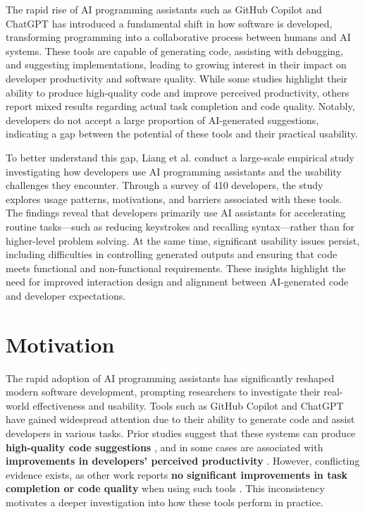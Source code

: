 The rapid rise of AI programming assistants such as GitHub Copilot and ChatGPT has introduced a fundamental shift in how software is developed, transforming programming into a collaborative process between humans and AI systems. These tools are capable of generating code, assisting with debugging, and suggesting implementations, leading to growing interest in their impact on developer productivity and software quality. While some studies highlight their ability to produce high-quality code and improve perceived productivity, others report mixed results regarding actual task completion and code quality. Notably, developers do not accept a large proportion of AI-generated suggestions, indicating a gap between the potential of these tools and their practical usability.

To better understand this gap, Liang et al. conduct a large-scale empirical study investigating how developers use AI programming assistants and the usability challenges they encounter. Through a survey of 410 developers, the study explores usage patterns, motivations, and barriers associated with these tools. The findings reveal that developers primarily use AI assistants for accelerating routine tasks—such as reducing keystrokes and recalling syntax—rather than for higher-level problem solving. At the same time, significant usability issues persist, including difficulties in controlling generated outputs and ensuring that code meets functional and non-functional requirements. These insights highlight the need for improved interaction design and alignment between AI-generated code and developer expectations.

\section{Motivation}
The rapid adoption of AI programming assistants has significantly reshaped modern software development, prompting researchers to investigate their real-world effectiveness and usability. Tools such as GitHub Copilot and ChatGPT have gained widespread attention due to their ability to generate code and assist developers in various tasks. Prior studies suggest that these systems can produce \textbf{high-quality code suggestions} \cite{xu2022systematic,yetistiren2022assessing}, and in some cases are associated with \textbf{improvements in developers’ perceived productivity} \cite{ziegler2022productivity}. However, conflicting evidence exists, as other work reports \textbf{no significant improvements in task completion or code quality} when using such tools \cite{imai2022copilot,vaithilingam2022expectation}. This inconsistency motivates a deeper investigation into how these tools perform in practice.

